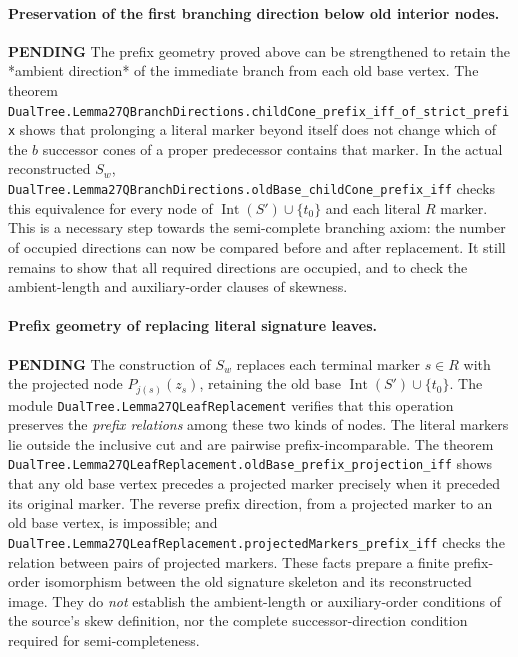 \documentclass[11pt]{article}
\newcommand{\todo}{\textcolor{gray!70!black}{\textbf{PENDING}}}
\newcommand{\lean}[1]{\texttt{#1}}
\begin{document}
\paragraph{Preservation of the first branching direction below old interior nodes.} \todo
The prefix geometry proved above can be strengthened to retain the
*ambient direction* of the immediate branch from each old base
vertex.  The theorem
\lean{DualTree.Lemma27QBranchDirections.childCone_prefix_iff_of_strict_prefix}
shows that prolonging a literal marker beyond itself does not
change which of the $b$ successor cones of a proper predecessor
contains that marker.  In the actual reconstructed $S_w$,
\lean{DualTree.Lemma27QBranchDirections.oldBase_childCone_prefix_iff}
checks this equivalence for every node of
$\operatorname{Int}(S')\cup\{t_0\}$ and each literal $R$ marker.
This is a necessary step towards the semi-complete branching
axiom: the number of occupied directions can now be compared
before and after replacement.  It still remains to show that
all required directions are occupied, and to check the
ambient-length and auxiliary-order clauses of skewness.


\paragraph{Prefix geometry of replacing literal signature leaves.} \todo
The construction of $S_w$ replaces each terminal marker $s\in R$
with the projected node $P_{j(s)}(z_s)$, retaining the old base
$\operatorname{Int}(S')\cup\{t_0\}$.
The module \lean{DualTree.Lemma27QLeafReplacement} verifies that
this operation preserves the \emph{prefix relations} among these
two kinds of nodes.  The literal markers lie outside the inclusive
cut and are pairwise prefix-incomparable.
The theorem
\lean{DualTree.Lemma27QLeafReplacement.oldBase_prefix_projection_iff}
shows that any old base vertex precedes a projected marker precisely
when it preceded its original marker.
The reverse prefix direction, from a projected marker to an old base
vertex, is impossible; and
\lean{DualTree.Lemma27QLeafReplacement.projectedMarkers_prefix_iff}
checks the relation between pairs of projected markers.
These facts prepare a finite prefix-order isomorphism between the
old signature skeleton and its reconstructed image.
They do \emph{not} establish the ambient-length or auxiliary-order
conditions of the source's skew definition, nor the complete
successor-direction condition required for semi-completeness.
\end{document}
